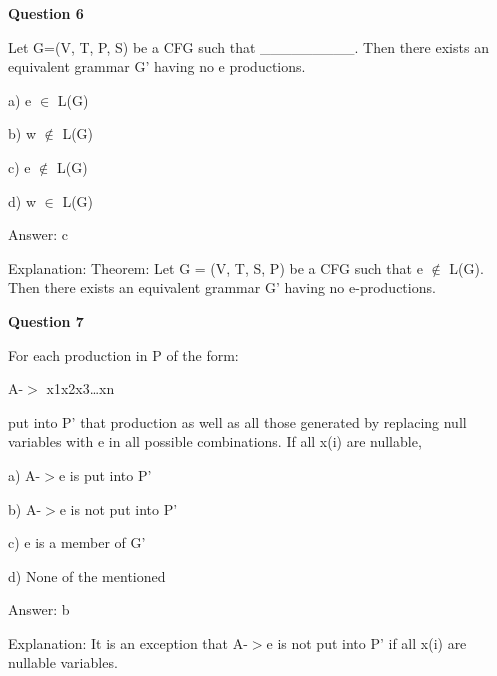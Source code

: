 \documentclass{article}
\begin{document}
\begin{mdframed}[linewidth=1pt, roundcorner=5pt, linecolor=gray!30, backgroundcolor=gray!5]
\textbf{Question 6} 

Let G=(V, T, P, S) be a CFG such that \_\_\_\_\_\_\_\_\_. Then there exists an equivalent grammar G' having no e productions.

a) e $\in$ L(G)

b) w $\notin$ L(G)

c) e $\notin$ L(G)

d) w $\in$ L(G)
\vspace{5pt} \par
\begin{tcolorbox}[colback=green!5, colframe=green!40!black, title=Solution]
Answer: c

Explanation: Theorem: Let G = (V, T, S, P) be a CFG such that  e $\notin$ L(G). Then there exists an equivalent grammar G' having no e-productions.
\end{tcolorbox}
\end{mdframed}
\newpage

\begin{mdframed}[linewidth=1pt, roundcorner=5pt, linecolor=gray!30, backgroundcolor=gray!5]
\textbf{Question 7} 

For each production in P of the form:

A-$>$ x1x2x3…xn

put into P' that production as well as all those generated by replacing null variables with e in all possible combinations. If all x(i) are nullable,

a) A-$>$e is put into P'

b) A-$>$e is not put into P'

c) e is a member of G'

d) None of the mentioned
\vspace{5pt} \par
\begin{tcolorbox}[colback=green!5, colframe=green!40!black, title=Solution]
Answer: b

Explanation: It is an exception that A-$>$e is not put into P' if all x(i) are nullable variables.
\end{tcolorbox}
\end{mdframed}
\end{document}
